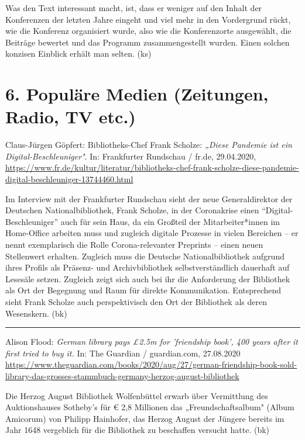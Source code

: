 \documentclass[a4paper,
fontsize=11pt,
oneside,
numbers=noperiodatend,
parskip=half-,
bibliography=totoc,
final
]{scrartcl}
\begin{document}
Was den Text interessant macht, ist, dass er weniger auf den Inhalt der
Konferenzen der letzten Jahre eingeht und viel mehr in den Vordergrund
rückt, wie die Konferenz organisiert wurde, also wie die Konferenzorte
ausgewählt, die Beiträge bewertet und das Programm zusammengestellt
wurden. Einen solchen konzisen Einblick erhält man selten. (ks)

\hypertarget{populuxe4re-medien-zeitungen-radio-tv-etc.}{%
\section{6. Populäre Medien (Zeitungen, Radio, TV
etc.)}\label{populuxe4re-medien-zeitungen-radio-tv-etc.}}

Claus-Jürgen Göpfert: Bibliotheks-Chef Frank Scholze: \emph{„Diese
Pandemie ist ein Digital-Beschleuniger"}. In: Frankfurter Rundschau /
fr.de, 29.04.2020,
\url{https://www.fr.de/kultur/literatur/bibliotheks-chef-frank-scholze-diese-pandemie-digital-beschleuniger-13744460.html}

Im Interview mit der Frankfurter Rundschau sieht der neue
Generaldirektor der Deutschen Nationalbibliothek, Frank Scholze, in der
Coronakrise einen \enquote{Digital-Beschleuniger} auch für sein Haus, da
ein Großteil der Mitarbeiter*innen im Home-Office arbeiten muss und
zugleich digitale Prozesse in vielen Bereichen -- er nennt exemplarisch
die Rolle Corona-relevanter Preprints -- einen neuen Stellenwert
erhalten. Zugleich muss die Deutsche Nationalbibliothek aufgrund ihres
Profils als Präsenz- und Archivbibliothek selbstverständlich dauerhaft
auf Lesesäle setzen. Zugleich zeigt sich auch bei ihr die Anforderung
der Bibliothek als Ort der Begegnung und Raum für direkte Kommunikation.
Entsprechend sieht Frank Scholze auch perspektivisch den Ort der
Bibliothek als deren Wesenskern. (bk)

\begin{center}\rule{0.5\linewidth}{0.5pt}\end{center}

Alison Flood: \emph{German library pays £2.5m for 'friendship book', 400
years after it first tried to buy it.} In: The Guardian / guardian.com,
27.08.2020
\url{https://www.theguardian.com/books/2020/aug/27/german-friendship-book-sold-library-das-grosses-stammbuch-germany-herzog-august-bibliothek}

Die Herzog August Bibliothek Wolfenbüttel erwarb über Vermittlung des
Auktionshauses Sotheby's für € 2,8 Millionen das „Freundschaftsalbum"
(Album Amicorum) von Philipp Hainhofer, das Herzog August der Jüngere
bereits im Jahr 1648 vergeblich für die Bibliothek zu beschaffen
versucht hatte. (bk)
\end{document}
